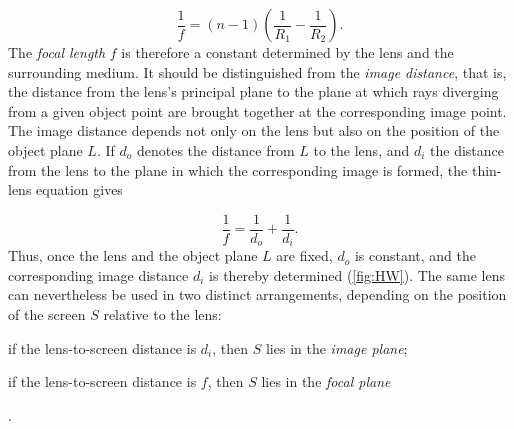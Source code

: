 \documentclass[pdflatex]{sn-jnl}
\begin{document}
\begin{equation*}
\frac{1}{f}=(n-1)\left(\frac{1}{R_1}-\frac{1}{R_2}\right).
\end{equation*}
%
The \emph{focal length} $f$ is therefore a constant determined by the lens and the surrounding medium. It should be distinguished from the \emph{image distance}, that is, the distance from the lens's principal plane to the plane at which rays diverging from a given object point are brought together at the corresponding image point. The image distance depends not only on the lens but also on the position of the object plane $L$. If $d_o$ denotes the distance from $L$ to the lens, and $d_i$ the distance from the lens to the plane in which the corresponding image is formed, the thin-lens equation gives

\begin{equation*}
\frac{1}{f}=\frac{1}{d_o}+\frac{1}{d_i}.
\end{equation*}
%
Thus, once the lens and the object plane $L$ are fixed, $d_o$ is constant, and the corresponding image distance $d_i$ is thereby determined (\cref{fig:HW}). The same lens can nevertheless be used in two distinct arrangements, depending on the position of the screen $S$ relative to the lens: \begin{inparaenum}[(a)] \item if the lens-to-screen distance is $d_i$, then $S$ lies in the \emph{image plane}; \item if the lens-to-screen distance is $f$, then $S$ lies in the \emph{focal plane} \end{inparaenum}.
\end{document}
